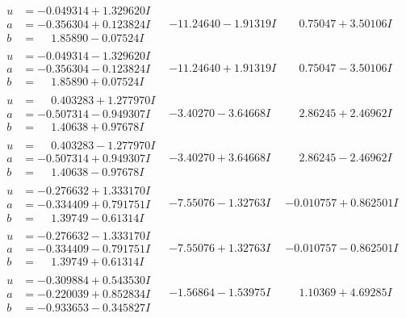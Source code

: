 \documentclass[1p]{elsarticle_modified}
\theoremstyle{definition}
\begin{document}
$$\begin{array}{c|c|c}
\begin{aligned}
u &= -0.049314 + 1.329620 I \\
a &= -0.356304 + 0.123824 I \\
b &= \phantom{-}1.85890 - 0.07524 I\end{aligned}
 & -11.24640 - 1.91319 I & \phantom{-}0.75047 + 3.50106 I \\ \hline\begin{aligned}
u &= -0.049314 - 1.329620 I \\
a &= -0.356304 - 0.123824 I \\
b &= \phantom{-}1.85890 + 0.07524 I\end{aligned}
 & -11.24640 + 1.91319 I & \phantom{-}0.75047 - 3.50106 I \\ \hline\begin{aligned}
u &= \phantom{-}0.403283 + 1.277970 I \\
a &= -0.507314 - 0.949307 I \\
b &= \phantom{-}1.40638 + 0.97678 I\end{aligned}
 & -3.40270 - 3.64668 I & \phantom{-}2.86245 + 2.46962 I \\ \hline\begin{aligned}
u &= \phantom{-}0.403283 - 1.277970 I \\
a &= -0.507314 + 0.949307 I \\
b &= \phantom{-}1.40638 - 0.97678 I\end{aligned}
 & -3.40270 + 3.64668 I & \phantom{-}2.86245 - 2.46962 I \\ \hline\begin{aligned}
u &= -0.276632 + 1.333170 I \\
a &= -0.334409 + 0.791751 I \\
b &= \phantom{-}1.39749 - 0.61314 I\end{aligned}
 & -7.55076 - 1.32763 I & -0.010757 + 0.862501 I \\ \hline\begin{aligned}
u &= -0.276632 - 1.333170 I \\
a &= -0.334409 - 0.791751 I \\
b &= \phantom{-}1.39749 + 0.61314 I\end{aligned}
 & -7.55076 + 1.32763 I & -0.010757 - 0.862501 I \\ \hline\begin{aligned}
u &= -0.309884 + 0.543530 I \\
a &= -0.220039 + 0.852834 I \\
b &= -0.933653 - 0.345827 I\end{aligned}
 & -1.56864 - 1.53975 I & \phantom{-}1.10369 + 4.69285 I \\ \hline\begin{aligned}

\end{aligned}
\end{array}$$
\end{document}
